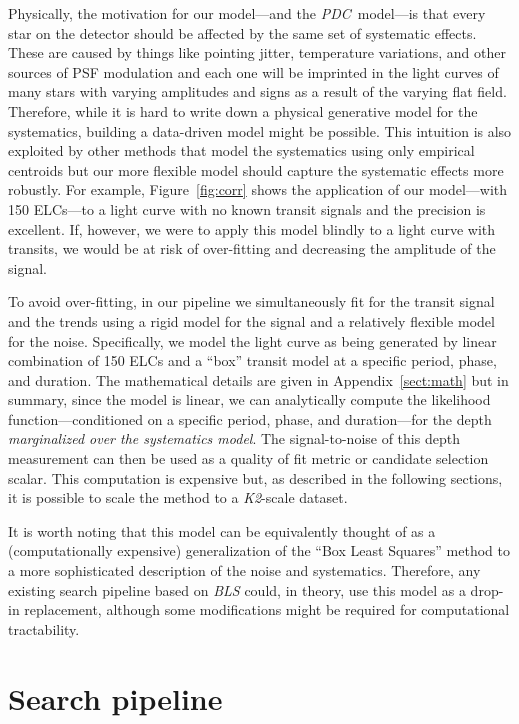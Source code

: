 \documentclass[12pt,preprint]{aastex}
\newcommand{\project}[1]{\textsl{#1}} %
\newcommand{\KT}{\project{K2}}
\newcommand{\pdc}{\project{PDC}}
\newcommand{\figref}[1]{\ref{fig:#1}}
\newcommand{\Fig}[1]{Figure~\figref{#1}}
\newcommand{\App}[1]{Appendix~\ref{sect:#1}}
\newcommand{\app}[1]{\App{#1}}
\begin{document}
Physically, the motivation for our model---and the \pdc\ model---is that every
star on the detector should be affected by the same set of systematic effects.
These are caused by things like pointing jitter, temperature variations, and
other sources of PSF modulation and each one will be imprinted in the light
curves of many stars with varying amplitudes and signs as a result of the
varying flat field.
Therefore, while it is hard to write down a physical generative model for the
systematics, building a data-driven model might be possible.
This intuition is also exploited by other methods that model the systematics
using only empirical centroids \citep{Vanderburg:2014, Aigrain:2015,
Crossfield:2015} but our more flexible model should capture the systematic
effects more robustly.
For example, \Fig{corr} shows the application of our model---with 150
ELCs---to a light curve with no known transit signals and the precision is
excellent.
If, however, we were to apply this model blindly to a light curve with
transits, we would be at risk of over-fitting and decreasing the amplitude of
the signal.

To avoid over-fitting, in our pipeline we simultaneously fit for the transit
signal and the trends using a rigid model for the signal and a relatively
flexible model for the noise.
Specifically, we model the light curve as being generated by linear
combination of 150 ELCs and a ``box'' transit model at a specific period,
phase, and duration.
The mathematical details are given in \app{math} but in summary, since the
model is linear, we can analytically compute the likelihood
function---conditioned on a specific period, phase, and duration---for the
depth \emph{marginalized over the systematics model}.
The signal-to-noise of this depth measurement can then be used as a quality
of fit metric or candidate selection scalar.
This computation is expensive but, as described in the following sections, it
is possible to scale the method to a \KT-scale dataset.

It is worth noting that this model can be equivalently thought of as a
(computationally expensive) generalization of the ``Box Least Squares''
\citep[\project{BLS};][]{bls} method to a more sophisticated description of
the noise and systematics.
Therefore, any existing search pipeline based on \project{BLS} could, in
theory, use this model as a drop-in replacement, although some modifications
might be required for computational tractability.


\section{Search pipeline}
\label{sec:search}
\end{document}
